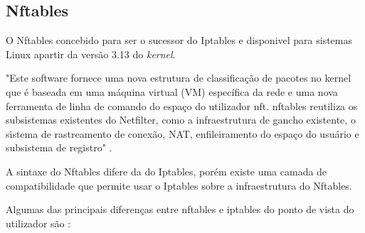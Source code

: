 
\subsection{Nftables}

O Nftables \cite{nftables} concebido para ser o sucessor do Iptables e disponivel para sistemas 
Linux apartir da versão 3.13 do \textit{kernel}.

"Este software fornece uma nova estrutura de classificação de pacotes no kernel 
que é baseada em uma máquina virtual (VM) específica da rede e uma nova ferramenta 
de linha de comando do espaço do utilizador nft. nftables reutiliza os subsistemas 
existentes do Netfilter, como a infraestrutura de gancho existente, o sistema de 
rastreamento de conexão, NAT, enfileiramento do espaço do usuário e subsistema de 
registro" \cite{nftables}.

A sintaxe do Nftables difere da do Iptables, porém existe uma camada de 
compatibilidade que permite usar o Iptables sobre a infraestrutura do Nftables.


Algumas das principais diferenças entre nftables e iptables do ponto de vista do 
utilizador são \cite{diffiptenft}:

